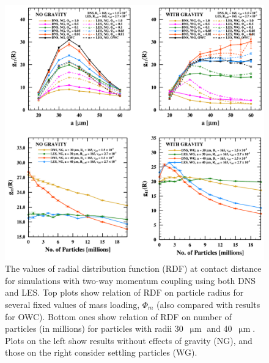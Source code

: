 \documentclass{pracamgren}
\begin{document}
\begin{figure}[h]
\centering
\includegraphics[width=13.5cm]{img/plots/2-2-3a-twcrdf.pdf}
\caption{
The values of radial distribution function (RDF) at contact distance for simulations with two-way momentum coupling using both DNS and LES.
Top plots show relation of RDF on particle radius for several fixed values of mass loading, $\Phi_m$ (also compared with results for OWC).
Bottom ones show relation of RDF on number of particles (in millions) for particles with radii $30$~$\upmu\text{m}$ and $40$~$\upmu\text{m}$.
Plots on the left show results without effects of gravity (NG), and those on the right consider settling particles (WG).
}
\label{fig:twcrdf}
\end{figure}
\end{document}
